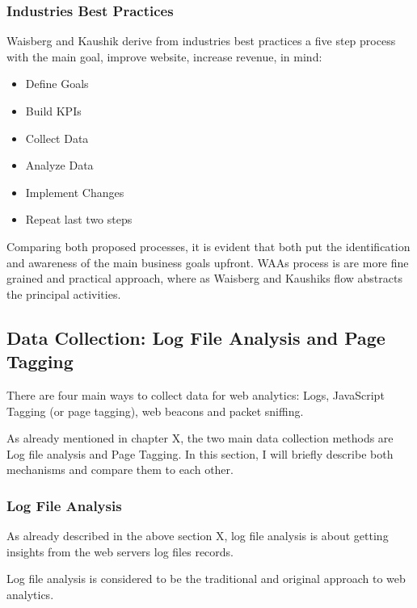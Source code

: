 \subsubsection{Industries Best Practices}

Waisberg and Kaushik derive from industries best practices a five step process with the main goal, improve website, increase revenue, in mind:%

\begin{itemize}
\item Define Goals
\item Build KPIs
\item Collect Data
\item Analyze Data
\item Implement Changes
\item Repeat last two steps
\end{itemize}


Comparing both proposed processes, it is evident that both put the identification and awareness of the main business goals upfront.
WAAs process is are more fine grained and practical approach, where as Waisberg and Kaushiks flow abstracts the principal activities.





\subsection{Data Collection: Log File Analysis and Page Tagging}

There are four main ways to collect data for web analytics: Logs, JavaScript Tagging (or page tagging), web beacons and packet sniffing. %

As already mentioned in chapter X,  the two main data collection methods are Log file analysis and Page Tagging.
In this section, I will briefly describe both mechanisms and compare them to each other.


\subsubsection{Log File Analysis}

As already described in the above section X, log file analysis is about getting insights from the web servers log files records.

Log file analysis is considered to be the traditional and original approach to web analytics. %

